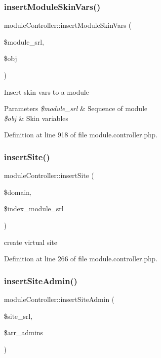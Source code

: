 \subsubsection{\texorpdfstring{insert\+Module\+Skin\+Vars()}{insertModuleSkinVars()}}
{\footnotesize\ttfamily module\+Controller\+::insert\+Module\+Skin\+Vars (\begin{DoxyParamCaption}\item[{}]{\$module\+\_\+srl,  }\item[{}]{\$obj }\end{DoxyParamCaption})}

Insert skin vars to a module 
\begin{DoxyParams}{Parameters}
{\em \$module\+\_\+srl} & Sequence of module \\
\hline
{\em \$obj} & Skin variables \\
\hline
\end{DoxyParams}


Definition at line 918 of file module.\+controller.\+php.

\mbox{\label{classmoduleController_acca9e2ce3fbb24f614816bb4c34a5506}} 
\subsubsection{\texorpdfstring{insert\+Site()}{insertSite()}}
{\footnotesize\ttfamily module\+Controller\+::insert\+Site (\begin{DoxyParamCaption}\item[{}]{\$domain,  }\item[{}]{\$index\+\_\+module\+\_\+srl }\end{DoxyParamCaption})}



create virtual site 



Definition at line 266 of file module.\+controller.\+php.

\mbox{\label{classmoduleController_a970ea23d2ebfdb1353139923a05a173a}} 
\subsubsection{\texorpdfstring{insert\+Site\+Admin()}{insertSiteAdmin()}}
{\footnotesize\ttfamily module\+Controller\+::insert\+Site\+Admin (\begin{DoxyParamCaption}\item[{}]{\$site\+\_\+srl,  }\item[{}]{\$arr\+\_\+admins }\end{DoxyParamCaption})}



